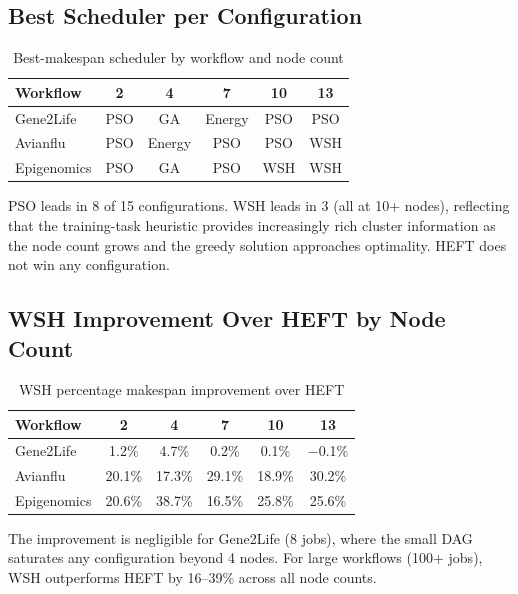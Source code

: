 \documentclass[10pt,twocolumn]{article}
\begin{document}
\subsection{Best Scheduler per Configuration}

\begin{table}[H]
\centering
\caption{Best-makespan scheduler by workflow and node count}
\label{tab:best}
\begin{tabular}{@{}lccccc@{}}
\toprule
\textbf{Workflow} & \textbf{2} & \textbf{4} & \textbf{7} & \textbf{10} & \textbf{13}\\
\midrule
Gene2Life   & PSO & GA     & Energy & PSO & PSO \\
Avianflu    & PSO & Energy & PSO    & PSO & WSH \\
Epigenomics & PSO & GA     & PSO    & WSH & WSH \\
\bottomrule
\end{tabular}
\end{table}

PSO leads in 8 of 15 configurations. WSH leads in 3 (all at 10+ nodes), reflecting
that the training-task heuristic provides increasingly rich cluster information as
the node count grows and the greedy solution approaches optimality. HEFT does not
win any configuration.

\subsection{WSH Improvement Over HEFT by Node Count}

\begin{table}[H]
\centering
\caption{WSH percentage makespan improvement over HEFT}
\label{tab:wsh_improvement}
\begin{tabular}{@{}lccccc@{}}
\toprule
\textbf{Workflow} & \textbf{2} & \textbf{4} & \textbf{7} & \textbf{10} & \textbf{13}\\
\midrule
Gene2Life   & 1.2\%  & 4.7\%  & 0.2\%  & 0.1\%   & $-$0.1\% \\
Avianflu    & 20.1\% & 17.3\% & 29.1\% & 18.9\%  & 30.2\%   \\
Epigenomics & 20.6\% & 38.7\% & 16.5\% & 25.8\%  & 25.6\%   \\
\bottomrule
\end{tabular}
\end{table}

The improvement is negligible for Gene2Life (8 jobs), where the small DAG saturates
any configuration beyond 4 nodes. For large workflows (100+ jobs), WSH outperforms
HEFT by 16--39\% across all node counts.
\end{document}
